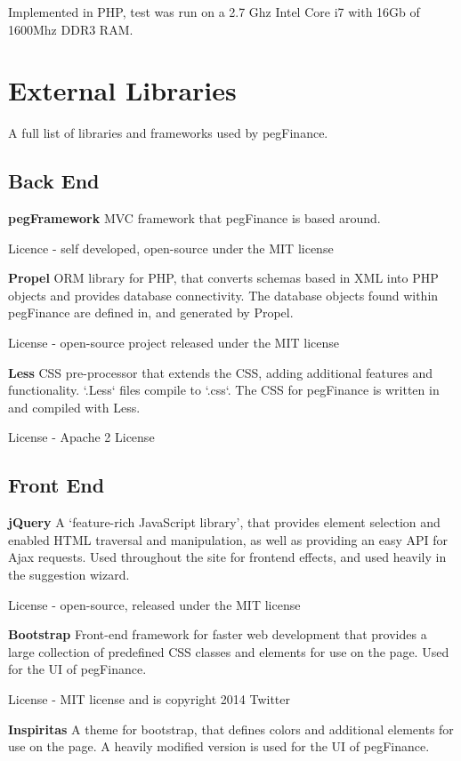 \begin{appendices}
Implemented in PHP, test was run on a 2.7 Ghz Intel Core i7 with 16Gb of 1600Mhz DDR3 RAM.



\chapter{External Libraries} \label{app:externallibraries}

A full list of libraries and frameworks used by pegFinance.

\section{Back End}
\textbf{pegFramework}
MVC framework that pegFinance is based around. 

Licence - self developed, open-source under the MIT license

\textbf{Propel}
ORM library for PHP, that converts schemas based in XML into PHP objects and provides database connectivity.
%
The database objects found within pegFinance are defined in, and generated by Propel. 

License - open-source project released under the MIT license

\textbf{Less}
CSS pre-processor that extends the CSS, adding additional features and functionality. `.Less` files compile to `.css`.
%
The CSS for pegFinance is written in and compiled with Less.

License - Apache 2 License

\section{Front End}
\textbf{jQuery}
A `feature-rich JavaScript library', that provides element selection and enabled HTML traversal and manipulation, as well as providing an easy API for Ajax requests.
%
Used throughout the site for frontend effects, and used heavily in the suggestion wizard.

License - open-source, released under the MIT license

\textbf{Bootstrap}
Front-end framework for faster web development that provides a large collection of predefined CSS classes and elements for use on the page.
%
Used for the UI of pegFinance.

License - MIT license and is copyright 2014 Twitter

\textbf{Inspiritas}
A theme for bootstrap, that defines colors and additional elements for use on the page.
%
A heavily modified version is used for the UI of pegFinance.


\end{appendices}
